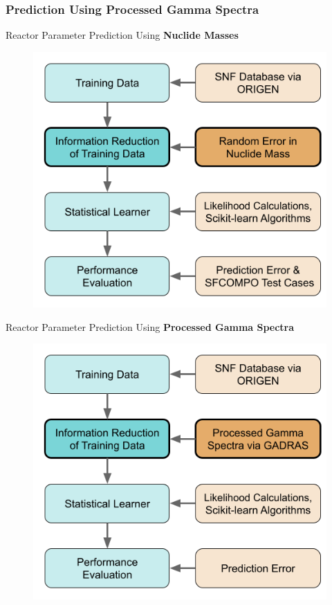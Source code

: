 
\begin{frame}
  \frametitle{Prediction Using Processed Gamma Spectra}
  \begin{adjustwidth}{-10pt}{-10pt}
  \begin{minipage}{0.5\textwidth}
    \begin{block}{Reactor Parameter Prediction Using \textbf{Nuclide Masses}}
      \begin{figure}
        \centering
        \includegraphics[width=\textwidth]{./figures/methodology1_pres.png}
      \end{figure}
    \end{block}
  \end{minipage}%
  \hfill
  \begin{minipage}{0.5\textwidth}
    \begin{block}{Reactor Parameter Prediction Using \textbf{Processed Gamma Spectra}}
      \begin{figure}
        \centering
        \includegraphics[width=\textwidth]{./figures/methodology2_pres.png}

\end{figure}
\end{block}
\end{minipage}
\end{adjustwidth}
\end{frame}

